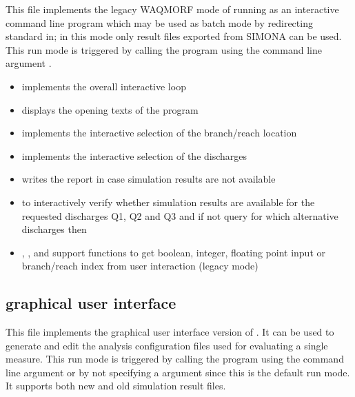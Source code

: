 This file implements the legacy WAQMORF mode of running as an interactive command line program which may be used as batch mode by redirecting standard in; in this mode only result files exported from SIMONA can be used.
This run mode is triggered by calling the program using the command line argument .

\begin{itemize}
\item {} implements the overall interactive loop
\item {} displays the opening texts of the program
\item {} implements the interactive selection of the branch/reach location
\item {} implements the interactive selection of the discharges

\item {} writes the report in case simulation results are not available
\item {} to interactively verify whether simulation results are available for the requested discharges Q1, Q2 and Q3 and if not query for which alternative discharges then
\item {}, ,  and  support functions to get boolean, integer, floating point input or branch/reach index from user interaction (legacy mode)
\end{itemize}

\subsection{graphical user interface }

This file implements the graphical user interface version of \dfastmi.
It can be used to generate and edit the analysis configuration files used for evaluating a single measure.
This run mode is triggered by calling the program using the command line argument  or by not specifying a  argument since this is the default run mode.
It supports both new and old simulation result files.

